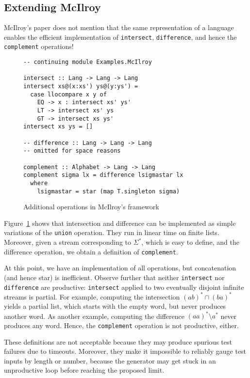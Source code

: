 \subsection{Extending McIlroy}
\label{sec:extending-mcilroy}

McIlroy's paper does not mention that the same representation of a
language enables the efficient implementation of
\lstinline{intersect}, \lstinline{difference}, and hence the
\lstinline{complement} operations!

\begin{figure}[tp]
\begin{lstlisting}
-- continuing module Examples.McIlroy

intersect :: Lang -> Lang -> Lang
intersect xs@(x:xs') ys@(y:ys') =
  case llocompare x y of
    EQ -> x : intersect xs' ys'
    LT -> intersect xs' ys
    GT -> intersect xs ys'
intersect xs ys = []

-- difference :: Lang -> Lang -> Lang
-- omitted for space reasons

complement :: Alphabet -> Lang -> Lang
complement sigma lx = difference lsigmastar lx
  where
    lsigmastar = star (map T.singleton sigma)
\end{lstlisting}
\vspace{-\baselineskip}
  \caption{Additional operations in McIlroy's framework}
  \label{fig:more-regular-operators}
\end{figure}
Figure~\ref{fig:more-regular-operators} shows that intersection and difference can be
implemented as simple variations of the \lstinline{union} operation. They run in linear
time on finite lists. Moreover, given a stream corresponding to $\Sigma^*$, which is easy
to define, and the difference operation, we obtain a definition of \lstinline{complement}.

At this point, we have an implementation of all 
operations, but concatenation (and hence star) is
inefficient. Observe further that neither \lstinline{intersect} nor
\lstinline{difference} are productive:
\lstinline{intersect} applied to two eventually disjoint infinite
streams is partial. For example, computing the intersection
$(ab)^* \cap (ba)^*$ yields a partial list, which starts with the
empty word, but never produces another word. As another example,
computing the difference $(aa)^* \setminus a^*$ never produces any
word.  Hence, the \lstinline{complement} operation is not
productive, either.

These definitions are not acceptable because they may produce
spurious test failures due to timeouts. Moreover, they make it
impossible to reliably gauge test inputs by length or number, 
because the generator may get stuck in an unproductive loop before
reaching the proposed limit.

